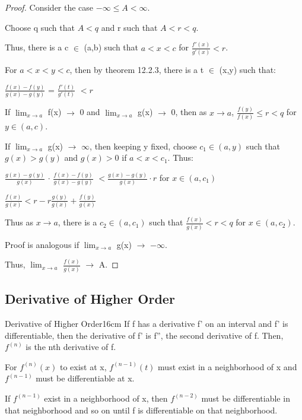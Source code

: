     \begin{proof}
        Consider the case $-\infty \leq A < \infty$.

        Choose q such that $A < q$ and r such that $A < r < q$.

        Thus, there is a c $\in$ (a,b) such that $a < x < c$
        for $\frac{f'(x)}{g'(x)} < r$.

        For $a < x < y < c$, then by {\color{red} theorem 12.2.3},
        there is a t $\in$ (x,y) such that:

        \hspace{1cm}
        $\frac{f(x) - f(y)}{g(x)-g(y)}$
        = $\frac{f'(t)}{g'(t)}$ $< r$

        If $\lim_{x \rightarrow a}$ f(x) $\rightarrow$ 0 and
        $\lim_{x \rightarrow a}$ g(x) $\rightarrow$ 0, then
        as $x \rightarrow a$,
        $\frac{f(y)}{f(x)} \leq r < q$ for $y \in (a,c)$.

        If $\lim_{x \rightarrow a}$ g(x) $\rightarrow$ $\infty$, then
        keeping y fixed, choose $c_1 \in (a,y)$ such that $g(x) > g(y)$
        and $g(x) > 0$ if $a < x < c_1$. Thus:

        \hspace{1cm}
        $\frac{g(x)-g(y)}{g(x)}$ $\cdot$ $\frac{f(x) - f(y)}{g(x)-g(y)}$
        $< \frac{g(x)-g(y)}{g(x)} \cdot r$ for $x \in (a,c_1)$

        \hspace{1cm}
        $\frac{f(x)}{g(x)} < r - r \frac{g(y)}{g(x)} + \frac{f(y)}{g(x)}$
        
        Thus as $x \rightarrow a$, there is a $c_2 \in (a,c_1)$ such that
        $\frac{f(x)}{g(x)} < r < q$ for $x \in (a,c_2)$.

        Proof is analogous if $\lim_{x \rightarrow a}$ g(x) $\rightarrow$ $-\infty$.

        Thus, $\lim_{x \rightarrow a}$ $\frac{f(x)}{g(x)}$ $\rightarrow$ A.
    \end{proof}

    \vspace{0.5cm}





\subsection{ Derivative of Higher Order }

    \begin{definition}{Derivative of Higher Order}{16cm}
        If f has a derivative f' on an interval and f' is differentiable,
        then the derivative of f' is f'', the second derivative of f.
        Then, $f^{(n)}$ is the {\color{lblue} nth derivative} of f.

        For $f^{(n)}(x)$ to exist at x, $f^{(n-1)}(t)$ must exist
        in a neighborhood of x and $f^{(n-1)}$ must be differentiable at x.
        
        If $f^{(n-1)}$ exist in a neighborhood of x, then $f^{(n-2)}$
        must be differentiable in that neighborhood and
        so on until f is differentiable on that neighborhood.
    \end{definition}

